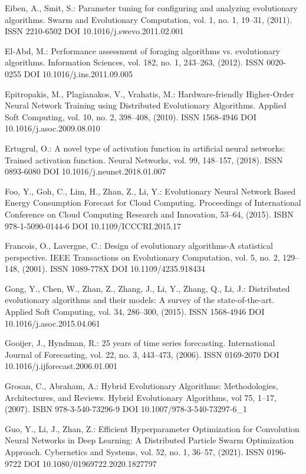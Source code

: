 \begin{thebibliography}{99.}
 Eiben, A., Smit, S.: Parameter tuning for configuring and analyzing evolutionary algorithms. Swarm and Evolutionary Computation, vol. 1, no. 1, 19--31, (2011). ISSN 2210-6502 DOI 10.1016/j.swevo.2011.02.001

 El-Abd, M.: Performance assessment of foraging algorithms vs. evolutionary algorithms. Information Sciences, vol. 182, no. 1, 243--263, (2012). ISSN 0020-0255 DOI 10.1016/j.ins.2011.09.005

 Epitropakis, M., Plagianakos, V., Vrahatis, M.: Hardware-friendly Higher-Order Neural Network Training using Distributed Evolutionary Algorithms. Applied Soft Computing, vol. 10, no. 2, 398--408, (2010). ISSN 1568-4946 DOI 10.1016/j.asoc.2009.08.010

 Ertugrul, O.: A novel type of activation function in artificial neural networks: Trained activation function. Neural Networks, vol. 99, 148--157, (2018). ISSN 0893-6080 DOI 10.1016/j.neunet.2018.01.007

 Foo, Y., Goh, C., Lim, H., Zhan, Z., Li, Y.: Evolutionary Neural Network Based Energy Consumption Forecast for Cloud Computing. Proceedings of International Conference on Cloud Computing Research and Innovation, 53--64, (2015). ISBN 978-1-5090-0144-6 DOI 10.1109/ICCCRI.2015.17

 Francois, O., Lavergne, C.: Design of evolutionary algorithms-A statistical perspective. IEEE Transactions on Evolutionary Computation, vol. 5, no. 2, 129--148, (2001). ISSN 1089-778X DOI 10.1109/4235.918434

 Gong, Y., Chen, W., Zhan, Z., Zhang, J., Li, Y., Zhang, Q., Li, J.: Distributed evolutionary algorithms and their models: A survey of the state-of-the-art. Applied Soft Computing, vol. 34, 286--300, (2015). ISSN 1568-4946 DOI 10.1016/j.asoc.2015.04.061

 Gooijer, J., Hyndman, R.: 25 years of time series forecasting. International Journal of Forecasting, vol. 22, no. 3, 443--473, (2006). ISSN 0169-2070 DOI 10.1016/j.ijforecast.2006.01.001

 Grosan, C., Abraham, A.: Hybrid Evolutionary Algorithms: Methodologies, Architectures, and Reviews. Hybrid Evolutionary Algorithms, vol 75, 1--17, (2007). ISBN 978-3-540-73296-9 DOI 10.1007/978-3-540-73297-6\_1

 Guo, Y., Li, J., Zhan, Z.: Efficient Hyperparameter Optimization for Convolution Neural Networks in Deep Learning: A Distributed Particle Swarm Optimization Approach. Cybernetics and Systems, vol. 52, no. 1, 36--57, (2021). ISSN 0196-9722 DOI 10.1080/01969722.2020.1827797


\end{thebibliography}
